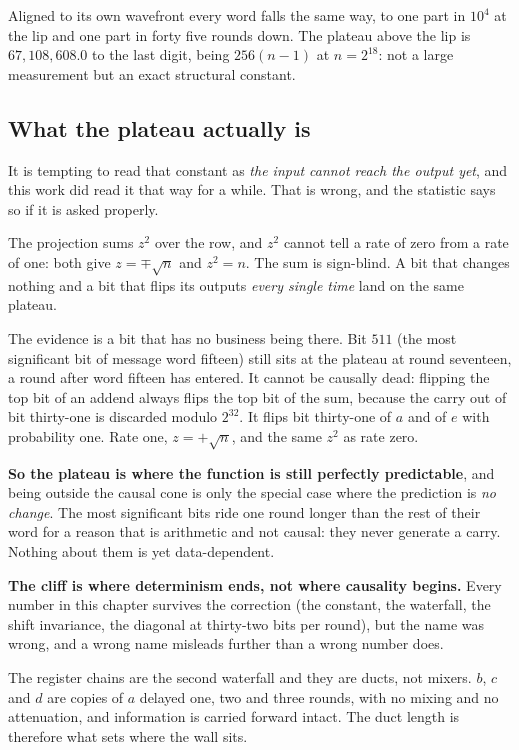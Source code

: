 Aligned to its own wavefront every word falls the same way, to one part in \(10^{4}\) at the lip and
one part in forty five rounds down. The plateau above the lip is \(67{,}108{,}608.0\) to the last
digit, being \(256(n-1)\) at \(n = 2^{18}\): not a large measurement but an exact structural
constant.

\subsection{What the plateau actually is}

It is tempting to read that constant as \emph{the input cannot reach the output yet}, and this work
did read it that way for a while. That is wrong, and the statistic says so if it is asked properly.

The projection sums \(z^{2}\) over the row, and \(z^{2}\) cannot tell a rate of zero from a rate of
one: both give \(z = \mp\sqrt{n}\) and \(z^{2} = n\). The sum is sign-blind. A bit that changes
nothing and a bit that flips its outputs \emph{every single time} land on the same plateau.

The evidence is a bit that has no business being there. Bit \(511\) (the most significant bit of
message word fifteen) still sits at the plateau at round seventeen, a round after word fifteen
has entered. It cannot be causally dead: flipping the top bit of an addend always flips the top bit
of the sum, because the carry out of bit thirty-one is discarded modulo \(2^{32}\). It flips bit
thirty-one of \(a\) and of \(e\) with probability one. Rate one, \(z = +\sqrt{n}\), and the same
\(z^{2}\) as rate zero.

\textbf{So the plateau is where the function is still perfectly predictable}, and being outside the
causal cone is only the special case where the prediction is \emph{no change}. The most significant
bits ride one round longer than the rest of their word for a reason that is arithmetic and not
causal: they never generate a carry. Nothing about them is yet data-dependent.

\textbf{The cliff is where determinism ends, not where causality begins.} Every number in this
chapter survives the correction (the constant, the waterfall, the shift invariance, the diagonal
at thirty-two bits per round), but the name was wrong, and a wrong name misleads further than a
wrong number does.

The register chains are the second waterfall and they are ducts, not mixers. \(b\), \(c\)
and \(d\) are copies of \(a\) delayed one, two and three rounds, with no mixing and no attenuation,
and information is carried forward intact. The duct length is therefore what sets where the wall
sits.

